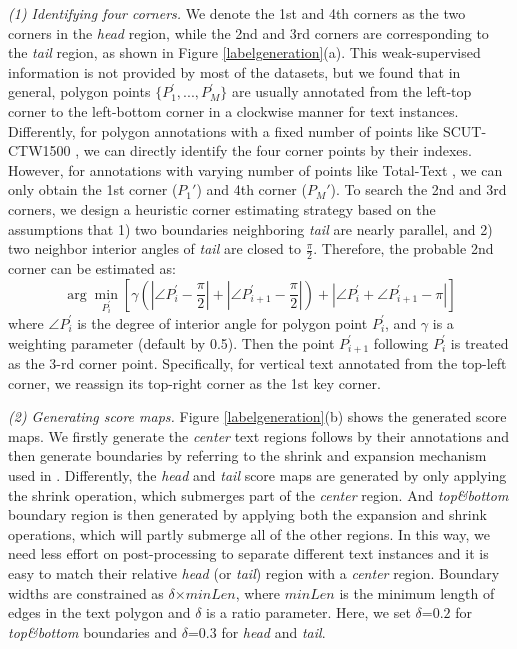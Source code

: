 \documentclass[letterpaper]{article} \usepackage{aaai20}  \usepackage{times}  \usepackage{helvet} \usepackage{courier}  \usepackage[hyphens]{url}  \usepackage{graphicx} \urlstyle{rm} \def\UrlFont{\rm}  \usepackage{graphicx}  \frenchspacing  \setlength{\pdfpagewidth}{8.5in}  \setlength{\pdfpageheight}{11in}  \usepackage{amsmath}
\begin{document}
\emph{(1) Identifying four corners.}
We denote the 1st and 4th corners as the two corners in the \emph{head} region, while the 2nd and 3rd corners are corresponding to the \emph{tail} region, as shown in Figure \ref{labelgeneration}(a). This weak-supervised information is not provided by most of the datasets, but we found that in general, polygon points $\{P_1^\prime, ..., P_{M}^\prime\}$ are usually annotated from the left-top corner to the left-bottom corner in a clockwise manner for text instances.
Differently, for polygon annotations with a fixed number of points like SCUT-CTW1500 \cite{liu2019curved}, we can directly identify the four corner points by their indexes.
However, for annotations with varying number of points like Total-Text \cite{ch2017total}, we can only obtain the 1st corner ($P_1'$) and 4th corner ($P_{M}'$).
To search the 2nd and 3rd corners, we design a heuristic corner estimating strategy based on the assumptions that 1) two boundaries neighboring \emph{tail} are nearly parallel, and 2) two neighbor interior angles of \emph{tail} are closed to $\frac{\pi}{2}$.
Therefore, the probable 2nd corner can be estimated as:
\begin{equation}
\arg\min_{P_i^\prime} [\gamma(|\angle P_{i}^\prime - \frac{\pi}{2}|+|\angle P_{i+1}^\prime -\frac{\pi}{2}|)+ |\angle P_{i}^\prime + \angle P_{i+1}^\prime - \pi|]
\end{equation}
where $\angle P_{i}^\prime$ is the degree of interior angle for polygon point $P_i^\prime$, and $\gamma$ is a weighting parameter (default by 0.5).
Then the point $P_{i+1}^\prime$ following $P_i^\prime$ is treated as the 3-rd corner point.
Specifically, for vertical text annotated from the top-left corner, we reassign its top-right corner as the 1st key corner.

\emph{(2) Generating score maps.}
Figure \ref{labelgeneration}(b) shows the generated score maps. We firstly generate the \emph{center} text regions follows by their annotations and then generate boundaries by referring to the shrink and expansion mechanism used in \cite{wu2017self}.
Differently, the \emph{head} and \emph{tail} score maps are generated by only applying the shrink operation, which submerges part of the \emph{center} region.
And \emph{top\&bottom} boundary region is then generated by applying both the expansion and shrink operations, which will partly submerge all of the other regions.
In this way, we need less effort on post-processing to separate different text instances and it is easy to match their relative \emph{head} (or \emph{tail}) region with a \emph{center} region.
Boundary widths are constrained as $\delta$$\times$$minLen$, where $minLen$ is the minimum length of edges in the text polygon and $\delta$ is a ratio parameter.
Here, we set $\delta$$\text{=}$$0.2$ for \emph{top\&bottom} boundaries and $\delta$$\text{=}$$0.3$ for \emph{head} and \emph{tail}.
\end{document}
